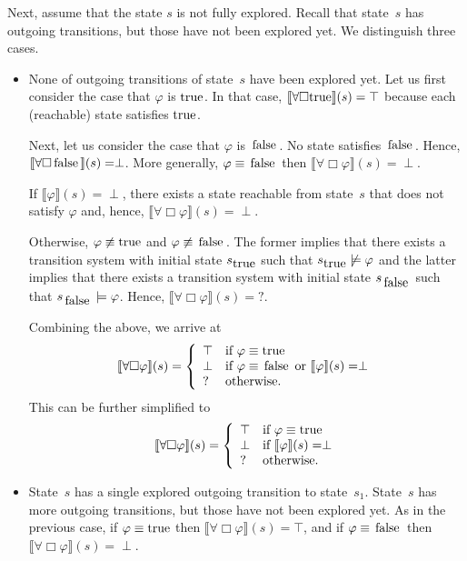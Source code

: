 \documentclass[12pt]{article}
\newcommand{\always}{\Box}
\newcommand{\TRUE}{\mbox{\lstinline{true}}}
\newcommand{\FALSE}{\mbox{\lstinline{false}}}
\theoremstyle{definition}
\newcommand{\satisfaction}[1]{\llbracket #1 \rrbracket}
\begin{document}
Next, assume that the state $s$ is not fully explored.  Recall that state~$s$ has outgoing transitions, but those have not been explored yet.  We distinguish three cases.
\begin{itemize}
\item 
None of outgoing transitions of state~$s$ have been explored yet.  Let us first consider the case that $\varphi$ is $\TRUE$.  In that case, $\satisfaction{\forall \always \TRUE}(s) = \top$ because each (reachable) state satisfies $\TRUE$.

Next, let us consider the case that $\varphi$ is $\FALSE$.  No state satisfies $\FALSE$.  Hence, $\satisfaction{\forall \always \FALSE}(s) = \perp$.  More generally, $\varphi \equiv \FALSE$ then $\satisfaction{\forall \always \varphi}(s) = \perp$.

If $\satisfaction{\varphi}(s) = \perp$, there exists a state reachable from state~$s$ that does not satisfy $\varphi$ and, hence, $\satisfaction{\forall \always \varphi}(s) = \perp$.

Otherwise, $\varphi \not\equiv \TRUE$ and $\varphi \not\equiv \FALSE$.  The former implies that there exists a transition system with initial state $s_{\TRUE}$ such that $s_{\TRUE} \not\models \varphi$ and the latter implies that there exists a transition system with initial state $s_{\FALSE}$ such that $s_{\FALSE} \models \varphi$.  Hence, $\satisfaction{\forall \always \varphi}(s) = ?$.

Combining the above, we arrive at
\[
\satisfaction{\forall \always \varphi}(s) = \left \{
\begin{array}{ll}
\top & \mbox{if $\varphi \equiv \TRUE$}\\
\perp & \mbox{if $\varphi \equiv \FALSE$ or $\satisfaction{\varphi}(s) = \perp$}\\
? & \mbox{otherwise.}
\end{array}
\right .
\]
This can be further simplified to
\[
\satisfaction{\forall \always \varphi}(s) = \left \{
\begin{array}{ll}
\top & \mbox{if $\varphi \equiv \TRUE$}\\
\perp & \mbox{if $\satisfaction{\varphi}(s) = \perp$}\\
? & \mbox{otherwise.}
\end{array}
\right .
\]
\item
State~$s$ has a single explored outgoing transition to state~$s_1$.  State~$s$ has more outgoing transitions, but those have not been explored yet.   As in the previous case, if  $\varphi \equiv \TRUE$ then $\satisfaction{\forall \always \varphi}(s) = \top$, and if $\varphi \equiv \FALSE$ then $\satisfaction{\forall \always \varphi}(s) = \perp$.


\end{itemize}
\end{document}

